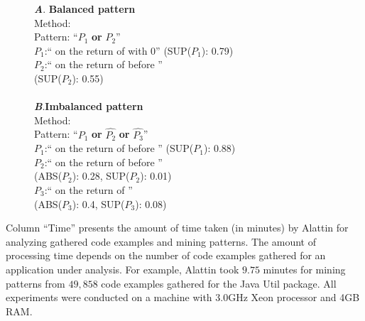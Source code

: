 \begin{figure}[t]
\textbf{\emph{A}}. \textbf{Balanced pattern}\\
Method: \\
Pattern: ``$P_1$ \textbf{or} $P_2$''\\
$P_1$:`` on the return of  with 0'' (SUP($P_1$): 0.79)\\
$P_2$:`` on the return of  before
''\\ (SUP($P_2$): 0.55)\\
\\
\textbf{\emph{B}}.\textbf{Imbalanced pattern}\\
Method: \\
Pattern: ``$P_1$ \textbf{or} $\hat{P_2}$ \textbf{or} $\hat{P_3}$''\\
$P_1$:`` on the return of  \hspace*{0.2in}before  '' (SUP($P_1$): 0.88) \\
$P_2$:`` on the return of  \hspace*{0.2in}before '' \\
\hspace*{0.4in} (ABS($P_2$): 0.28, SUP($P_2$): 0.01) \\
$P_3$:`` on the return of '' \\
\hspace*{0.4in} (ABS($P_3$): 0.4, SUP($P_3$): 0.08) \\
\vspace*{-3ex}
\end{figure}

Column ``Time'' presents the amount of time taken (in minutes) by Alattin for analyzing gathered code examples and mining patterns. The amount of processing time depends on the number of code examples gathered for an application under analysis. For example, Alattin took $9.75$ minutes for mining patterns from $49,858$ code examples gathered for the Java Util package. All experiments were conducted on a machine with 3.0GHz Xeon processor and 4GB RAM.

